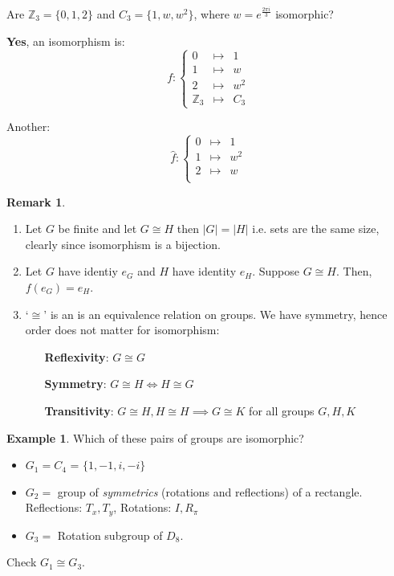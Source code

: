 \documentclass{article}
\theoremstyle{definition}
\newtheorem*{remark}{Remark}
\newtheorem*{exmp}{Example}
\newcommand{\ism}{\cong}
\begin{document}
Are $\mathbb{Z}_3=\{0,1,2\}$ and $C_3=\{1,w,w^2\}$, where $w=e^{\frac{2\pi i}{3}}$ isomorphic?

\textbf{Yes}, an isomorphism is:
\begin{equation}
  f : \left\{ 
       \begin{matrix}
        0 & \mapsto & 1 \\
        1 & \mapsto & w \\
        2 & \mapsto & w^2 \\
        \mathbb{Z}_3 & \mapsto & C_3
      \end{matrix}
      \right.
\end{equation}

Another:
\begin{equation}
  \hat{f} : \left\{
       \begin{matrix}
        0 & \mapsto & 1 \\
        1 & \mapsto & w^2 \\
        2 & \mapsto & w \\
      \end{matrix} 
      \right.
\end{equation}

\begin{remark}\hfill
\begin{enumerate}
  \item Let $G$ be finite and let $G \ism H$ then $|G|=|H|$ i.e. sets are the same size, clearly since isomorphism is a bijection.
  \item Let $G$ have identiy $e_G$ and $H$ have identity $e_H$. Suppose $G \ism H$. Then, $f(e_G)=e_H$.
  \item `$\ism$' is an is an equivalence relation on groups.
   We have symmetry, hence order does not matter for isomorphism:
    \begin{itemize}
      \item[\textbf{Reflexivity}:] $G \ism G $
      \item[\textbf{Symmetry}:] $G \ism H \iff H \ism G$
      \item[\textbf{Transitivity}:] $G \ism H, H \ism H \implies G \ism K $ for all groups $G,H,K$
    \end{itemize}
\end{enumerate}
\end{remark}

\begin{exmp}
Which of these pairs of groups are isomorphic?
\begin{itemize}
  \item 
$G_1 = C_4$ = $\{1,-1,i,-i\}$
  \item
$G_2 = $ group of \emph{symmetrics} (rotations and reflections) of a rectangle.\\
Reflections: $T_x, T_y$, Rotations: $I, R_\pi$
  \item $G_3 = $ Rotation subgroup of $D_8$.
\end{itemize}
  
Check $G_1 \ism G_3$.
\end{exmp}
\end{document}
